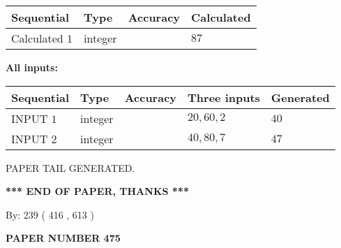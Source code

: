 \documentclass[12pt]{article}
\begin{document}
   
   
   
\noindent{}
   
   
  
  
\noindent\begin{tabular}{|l|l|l|l|}
\hline
 Sequential & Type & Accuracy & Calculated \\ 
\hline
 
 
  Calculated $  1 $ & integer &  & 
  $ 87 $ 
 \\  \hline  
 \end{tabular}
   
   
   
   
\noindent\vspace{0.1in}\hspace{-0.08in} {\textbf{\Large{All inputs: }}}
   
   
  
  
\noindent\begin{tabular}{|l|l|l|l|l|}
\hline
 Sequential & Type & Accuracy & Three inputs & Generated \\ 
\hline
 
 
  INPUT $  1 $ & integer &  & $
 20
 , 
 60
 , 
 2
 $ & $ 40 $ 
 \\  \hline  
 
 
  INPUT $  2 $ & integer &  & $
 40
 , 
 80
 , 
 7
 $ & $ 47 $ 
 \\  \hline  
 \end{tabular}
   
   
   
   
   
   
 \vspace{0.2in}
 
   
   
\vspace{2.0in} PAPER TAIL GENERATED.
   
   
   
   
\vspace{1.0in} 
{\textbf{\large{ *** END OF PAPER, THANKS *** }}} 
   
   
\hspace{1.0in} By: 
 239 ( 416 ,  613 )
   
   
   
   
\newpage 
\setcounter{page}{ 
   475001 } 
   
   
   
   
 {\textbf{ \Large{ PAPER NUMBER  475  }}}
   
\end{document}
